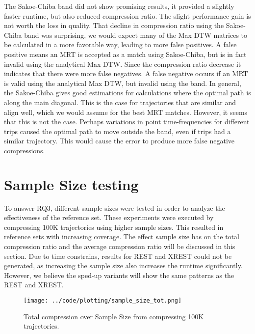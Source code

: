 The Sakoe-Chiba band did not show promising results, it provided a slightly faster runtime, but also reduced compression ratio. The slight performance gain is not worth the loss in quality. That decline in compression ratio using the Sakoe-Chiba band was surprising, we would expect many of the Max DTW matrices to be calculated in a more favorable way, leading to more false positives. A false positive means an MRT is accepted as a match using Sakoe-Chiba, but is in fact invalid using the analytical Max DTW. Since the compression ratio decrease it indicates that there were more false negatives. A false negative occurs if an MRT is valid using the analytical Max DTW, but invalid using the band. In general, the Sakoe-Chiba gives good estimations for calculations where the optimal path is along the main diagonal. This is the case for trajectories that are similar and align well, which we would assume for the best MRT matches. However, it seems that this is not the case. Perhaps variations in point time-frequencies for different trips caused the optimal path to move outside the band, even if trips had a similar trajectory. This would cause the error to produce more false negative compressions.

\section{Sample Size testing}\label{sec:sample_size}
To answer RQ3, different sample sizes were tested in order to analyze the effectiveness of the reference set. These experiments were executed by compressing 100K trajectories using higher sample sizes. This resulted in reference sets with increasing coverage. The effect sample size has on the total compression ratio and the average compression ratio will be discussed in this section. Due to time constrains, results for REST and XREST could not be generated, as increasing the sample size also increases the runtime significantly. However, we believe the sped-up variants will show the same patterns as the REST and XREST.

\begin{figure}[h]
    \begin{minipage}{0.99\linewidth}
        \centering
        \texttt{[image: ../code/plotting/sample\_size\_tot.png]}
        \caption{Total compression over Sample Size from compressing 100K trajectories.}
        \label{fig:sample_tot}
    \end{minipage}
\end{figure}

